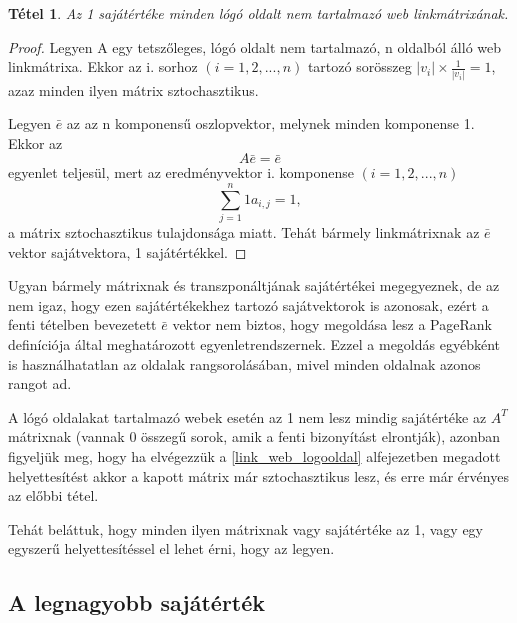 \documentclass[12pt,a4paper]{article}
\newtheorem{tetel}{Tétel}
\begin{document}
\begin{tetel}
	Az 1 sajátértéke minden lógó oldalt nem tartalmazó web linkmátrixának.
\end{tetel}
\begin{proof}
	Legyen A egy tetszőleges, lógó oldalt nem tartalmazó, n oldalból álló web linkmátrixa. Ekkor az i. sorhoz $(i = 1,2,...,n)$ tartozó sorösszeg $ |v_i| \times \frac{1}{|v_i|} = 1 $, azaz minden ilyen mátrix sztochasztikus.
	
	Legyen $\bar{e}$ az az n komponensű oszlopvektor, melynek minden komponense 1. Ekkor az
	\[ A \bar{e} = \bar{e} \] 
	egyenlet teljesül, mert az eredményvektor i. komponense $(i = 1,2,...,n)$
	\[ \sum_{j=1}^{n}{1 a_{i,j} } = 1, \] 
	a mátrix sztochasztikus tulajdonsága miatt. Tehát bármely linkmátrixnak az $\bar{e}$ vektor sajátvektora, 1 sajátértékkel.
\end{proof}
\vspace{0.5cm}

Ugyan bármely mátrixnak és transzponáltjának sajátértékei megegyeznek, de az nem igaz, hogy ezen sajátértékekhez tartozó sajátvektorok is azonosak, ezért a fenti tételben bevezetett $\bar{e}$ vektor nem biztos, hogy megoldása lesz a PageRank definíciója által meghatározott egyenletrendszernek. Ezzel a megoldás egyébként is használhatatlan az oldalak rangsorolásában, mivel minden oldalnak azonos rangot ad.

A lógó oldalakat tartalmazó webek esetén az 1 nem lesz mindig sajátértéke az $A^T$ mátrixnak (vannak 0 összegű sorok, amik a fenti bizonyítást elrontják), azonban figyeljük meg, hogy ha elvégezzük a \ref{link_web_logooldal} alfejezetben megadott helyettesítést akkor a kapott mátrix már sztochasztikus lesz, és erre már érvényes az előbbi tétel.

Tehát beláttuk, hogy minden ilyen mátrixnak vagy sajátértéke az 1, vagy egy egyszerű helyettesítéssel el lehet érni, hogy az legyen. 

\subsection{A legnagyobb sajátérték}\label{legnagyobb_sajatertek}
\end{document}
